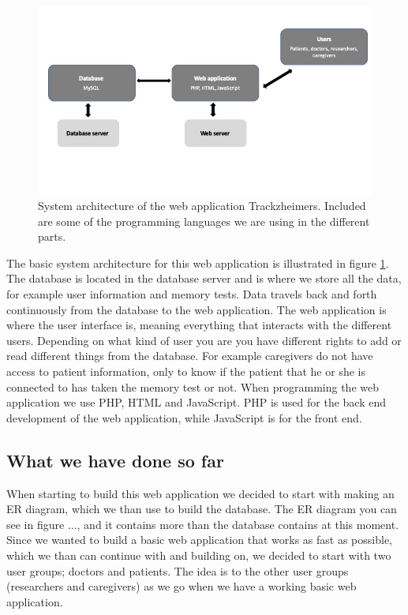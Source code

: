 \documentclass{article}
\begin{document}
\begin{figure}
    \centering
    \includegraphics[scale=0.5]{report/System_arch.jpg}
    \caption{System architecture of the web application Trackzheimers. Included are some of the programming languages we are using in the different parts. }
    \label{fig:system_arch}
\end{figure}

The basic system architecture for this web application is illustrated in figure \ref{fig:system_arch}. The database is located in the database server and is where we store all the data, for example user information and memory tests. Data travels back and forth continuously from the database to the web application. The web application is where the user interface is, meaning everything that interacts with the different users. Depending on what kind of user you are you have different rights to add or read different things from the database. For example caregivers do not have access to patient information, only to know if the patient that he or she is connected to has taken the memory test or not. When programming the web application we use PHP, HTML and JavaScript. PHP is used for the back end development of the web application, while JavaScript is for the front end. 

\subsection{What we have done so far}
When starting to build this web application we decided to start with making an ER diagram, which we than use to build the database. The ER diagram you can see in figure ..., and it contains more than the database contains at this moment. Since we wanted to build a basic web application that works as fast as possible, which we than can continue with and building on, we decided to start with two user groups; doctors and patients. The idea is to the other user groups (researchers and caregivers) as we go when we have a working basic web application. \newline
\newline




\end{document}

